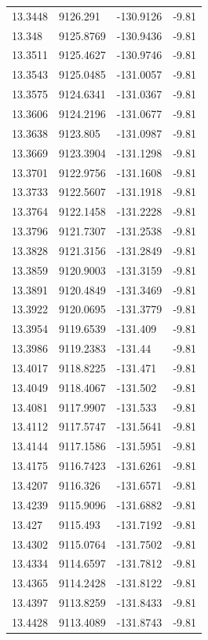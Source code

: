 \begin{table}[H]
\begin{tabular}{llll}
13.3448 & 9126.291 & -130.9126 & -9.81 \\
13.348 & 9125.8769 & -130.9436 & -9.81 \\
13.3511 & 9125.4627 & -130.9746 & -9.81 \\
13.3543 & 9125.0485 & -131.0057 & -9.81 \\
13.3575 & 9124.6341 & -131.0367 & -9.81 \\
13.3606 & 9124.2196 & -131.0677 & -9.81 \\
13.3638 & 9123.805 & -131.0987 & -9.81 \\
13.3669 & 9123.3904 & -131.1298 & -9.81 \\
13.3701 & 9122.9756 & -131.1608 & -9.81 \\
13.3733 & 9122.5607 & -131.1918 & -9.81 \\
13.3764 & 9122.1458 & -131.2228 & -9.81 \\
13.3796 & 9121.7307 & -131.2538 & -9.81 \\
13.3828 & 9121.3156 & -131.2849 & -9.81 \\
13.3859 & 9120.9003 & -131.3159 & -9.81 \\
13.3891 & 9120.4849 & -131.3469 & -9.81 \\
13.3922 & 9120.0695 & -131.3779 & -9.81 \\
13.3954 & 9119.6539 & -131.409 & -9.81 \\
13.3986 & 9119.2383 & -131.44 & -9.81 \\
13.4017 & 9118.8225 & -131.471 & -9.81 \\
13.4049 & 9118.4067 & -131.502 & -9.81 \\
13.4081 & 9117.9907 & -131.533 & -9.81 \\
13.4112 & 9117.5747 & -131.5641 & -9.81 \\
13.4144 & 9117.1586 & -131.5951 & -9.81 \\
13.4175 & 9116.7423 & -131.6261 & -9.81 \\
13.4207 & 9116.326 & -131.6571 & -9.81 \\
13.4239 & 9115.9096 & -131.6882 & -9.81 \\
13.427 & 9115.493 & -131.7192 & -9.81 \\
13.4302 & 9115.0764 & -131.7502 & -9.81 \\
13.4334 & 9114.6597 & -131.7812 & -9.81 \\
13.4365 & 9114.2428 & -131.8122 & -9.81 \\
13.4397 & 9113.8259 & -131.8433 & -9.81 \\
13.4428 & 9113.4089 & -131.8743 & -9.81 \\

\end{tabular}
\end{table}

